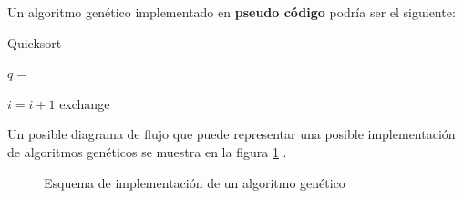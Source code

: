 \documentclass[
  a4paper,
  DIV=11,
  numbers=noendperiod]{scrreprt}
\begin{document}
Un algoritmo genético implementado en \textbf{pseudo código} podría ser
el siguiente:


\begin{algorithm}[htb!]
\caption{Quicksort}
\label{alg-genetico}
\begin{algorithmic}[1]
    \State $q = $ 
    \State {}
    \State {}
  \EndIf
\EndProcedure
{}
 

      \State $i = i + 1$
      \State exchange

\EndProcedure
\end{algorithmic}
\end{algorithm}

Un posible diagrama de flujo que puede representar una posible
implementación de algoritmos genéticos se muestra en la figura
\ref{fig-esquema-genetico} .

\begin{figure}


\caption{\label{fig-esquema-genetico}Esquema de implementación de un
algoritmo genético}

\end{figure}%
\end{document}
